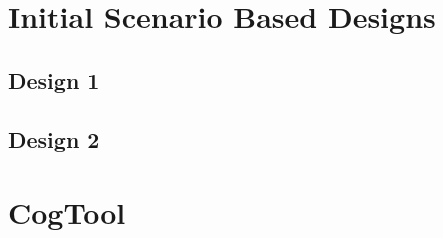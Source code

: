 \documentclass{article}
\begin{document}
\section{Initial Scenario Based Designs}
\subsection{Design 1}



\subsection{Design 2}




\section{CogTool}
\end{document}
